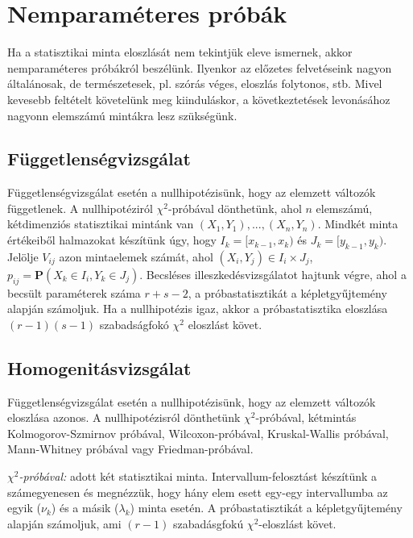 \chapter{Nemparaméteres próbák}

Ha a statisztikai minta eloszlását nem tekintjük eleve ismernek, akkor nemparaméteres próbákról beszélünk. Ilyenkor az előzetes felvetéseink nagyon általánosak, de természetesek, pl. szórás véges, eloszlás folytonos, stb. Mivel kevesebb feltételt követelünk meg kiinduláskor, a következtetések levonásához nagyonn elemszámú mintákra lesz szükségünk.

\section{Függetlenségvizsgálat}

Függetlenségvizsgálat esetén a nullhipotézisünk, hogy az elemzett változók függetlenek. A nullhipotéziról $\chi^2$-próbával dönthetünk, ahol $n$ elemszámú, kétdimenziós statisztikai mintánk van $(X_1,Y_1), ... , (X_n,Y_n)$. Mindkét minta értékeiből halmazokat készítünk úgy, hogy $I_k = [x_{k-1}, x_k)$ és $J_k = [y_{k-1}, y_k)$. Jelölje $V_{ij}$ azon mintaelemek számát, ahol $(X_i,Y_j) \in I_i \times J_j$, $p_{ij} = \mathbf{P}(X_k \in I_i, Y_k \in J_j)$. Becsléses illeszkedésvizsgálatot hajtunk végre, ahol a becsült paraméterek száma $r+s-2$, a próbastatisztikát a képletgyűjtemény alapján számoljuk. Ha a nullhipotézis igaz, akkor a próbastatisztika eloszlása $(r-1)(s-1)$ szabadságfokó $\chi^2$ eloszlást követ.

\section{Homogenitásvizsgálat}

Függetlenségvizsgálat esetén a nullhipotézisünk, hogy az elemzett változók eloszlása azonos. A nullhipotézisról dönthetünk $\chi^2$-próbával, kétmintás Kolmogorov-Szmirnov próbával, Wilcoxon-próbával, Kruskal-Wallis próbával, Mann-Whitney próbával vagy Friedman-próbával.

\emph{$\chi^2$-próbával:} adott két statisztikai minta. Intervallum-felosztást készítünk a számegyenesen és megnézzük, hogy hány elem esett egy-egy intervallumba az egyik ($\nu_k$) és a másik ($\lambda_k$) minta esetén. A próbastatisztikát a képletgyűjtemény alapján számoljuk, ami $(r-1)$ szabadásgfokú $\chi^2$-eloszlást követ.

